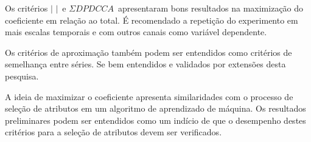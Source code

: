 Os critérios $|$ \pdcca $|$~e $\Sigma DPDCCA$~apresentaram bons resultados na maximização do coeficiente \dmc em relação ao total. É recomendado a repetição do experimento em mais escalas temporais e com outros canais como variável dependente.

Os critérios de aproximação também podem ser entendidos como critérios de semelhança entre séries. Se bem entendidos e validados por extensões desta pesquisa.

A ideia de maximizar o coeficiente apresenta similaridades com o processo de seleção de atributos em um algoritmo de aprendizado de máquina. Os resultados preliminares podem ser entendidos como um indício de que o desempenho destes critérios para a seleção de atributos devem ser verificados.